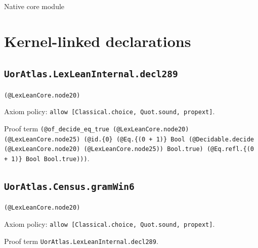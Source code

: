 \documentclass[11pt]{article}
\begin{document}
\begin{center}{\LARGE Native core module}\end{center}
\section*{Kernel-linked declarations}
\subsection*{\texttt{UorAtlas.LexLeanInternal.decl289}}
\noindent\texttt{(@LexLeanCore.node20)}\par
\noindent Axiom policy: \texttt{allow [Classical.choice, Quot.sound, propext]}.\par
\noindent Proof term \texttt{(@of\_decide\_eq\_true (@LexLeanCore.node20) (@LexLeanCore.node25) (@id.\{0\} (@Eq.\{(0 + 1)\} Bool (@Decidable.decide (@LexLeanCore.node20) (@LexLeanCore.node25)) Bool.true) (@Eq.refl.\{(0 + 1)\} Bool Bool.true)))}.\par
\subsection*{\texttt{UorAtlas.Census.gramWin6}}
\noindent\texttt{(@LexLeanCore.node20)}\par
\noindent Axiom policy: \texttt{allow [Classical.choice, Quot.sound, propext]}.\par
\noindent Proof term \texttt{UorAtlas.LexLeanInternal.decl289}.\par
\end{document}
